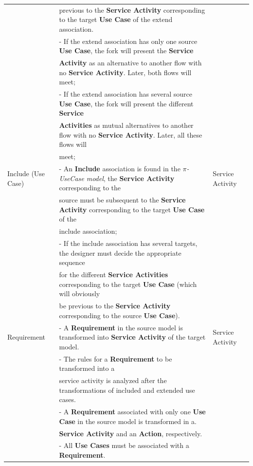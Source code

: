 \begin{table}[ht!]
\begin{tabular}{l|l|l}
      & previous to the \textbf{Service Activity} corresponding to the
      target \textbf{ Use Case} of the extend association. &\\

        &  - If the extend association has only one source \textbf{
        Use Case}, the fork will present the \textbf{Service} & \\
        &\textbf{ Activity} as an alternative to another flow with no \textbf{Service Activity}. Later, both flows will meet;&\\

       &  - If the extend association has several source \textbf{
        Use Case}, the fork will present the different \textbf{Service} & \\
        &\textbf{Activities} as mutual alternatives to another flow with no
        \textbf{Service Activity}. Later, all these flows will&\\
        &meet;&\\
    \hline

      Include (Use Case)    & - An \textbf{Include} association is found in the
      \textit{$\pi$-UseCase model},  the \textbf{Service Activity} corresponding to the    &
      Service Activity \\
       &source must be subsequent to the \textbf{Service Activity} corresponding
       to the target \textbf{ Use Case} of the & \\
      &include association;&\\

        &  - If the include association has several targets, the designer must
        decide the appropriate sequence & \\
        & for the different \textbf{Service Activities} corresponding to the
        target  \textbf{ Use Case} (which will obviously&\\

        &  be previous to the \textbf{Service Activity} corresponding to the
        source \textbf{ Use Case}).&\\

\hline

	Requirement & - A \textbf{Requirement} in the source model is transformed into
	\textbf{Service Activity} of the target model. & Service Activity
	\\ & - The rules for a \textbf{Requirement} to be transformed into a  &\\
	& service activity is analyzed after the transformations of included and
	extended use cases.&\\
	 &- A \textbf{Requirement} associated with only one \textbf{Use Case} in the
	 source model is transformed in a.&\\
	 &\textbf{Service Activity} and an \textbf{Action}, respectively. &\\
	&- All \textbf{Use Cases} must be associated with a \textbf{Requirement}.&\\

\hline

\end{tabular}
\end{table}



